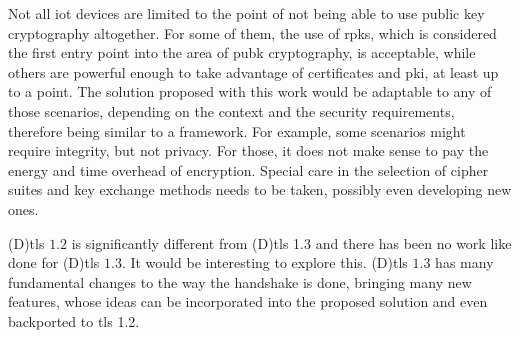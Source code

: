 \documentclass{llncs}
\begin{document}
Not all \gls{iot} devices are limited to the point of not being able to use
public key cryptography altogether. For some of them, the use of \gls{rpk}s, which is considered the first entry point into the area of \gls{pubk}
cryptography, is acceptable, while others are powerful enough to take
advantage of certificates and \gls{pki}, at least up to a point.
The solution proposed with this work
would be adaptable to any of those scenarios, depending on the context and the security
requirements, therefore being similar to a framework. For example, some scenarios
might require integrity, but not privacy. For those, it does not make sense to
pay the energy and time overhead of encryption. Special care in the
selection of cipher suites and key exchange methods needs to be taken, possibly even developing new ones.

(D)\gls{tls} $1.2$ is significantly different from (D)\gls{tls} 1.3
and there has been no work like \cite{RFC7924} done for (D)\gls{tls} $1.3$.
It would be interesting to explore this. (D)\gls{tls} $1.3$ has many fundamental changes
to the way the handshake is done, bringing many new features, whose ideas can
be incorporated into the proposed solution and even backported to \gls{tls} 1.2.
\end{document}

